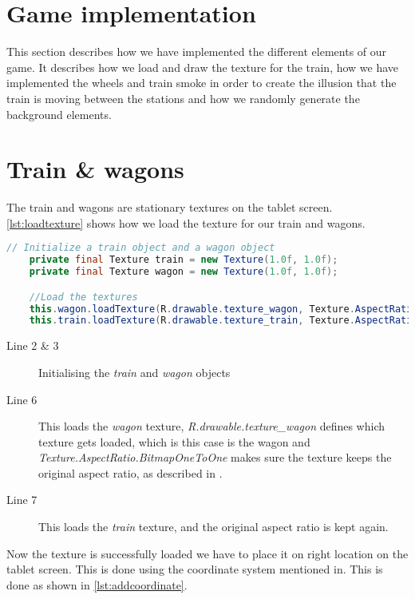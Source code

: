 \section{Game implementation}

This section describes how we have implemented the different elements of our game. It describes how we load and draw the texture for the train, how we have implemented the wheels and train smoke in order to create the illusion that the train is moving between the stations and how we randomly generate the background elements.



\section{Train \& wagons}

The train and wagons are stationary textures on the tablet screen. \autoref{lst:loadtexture} shows how we load the texture for our train and wagons. 

\begin{lstlisting}[language=java,firstnumber=1,caption={Loading the texture for our train and wagons},label=lst:loadtexture] 
	// Initialize a train object and a wagon object
	private final Texture train = new Texture(1.0f, 1.0f);
	private final Texture wagon = new Texture(1.0f, 1.0f);

	//Load the textures
	this.wagon.loadTexture(R.drawable.texture_wagon, Texture.AspectRatio.BitmapOneToOne);
	this.train.loadTexture(R.drawable.texture_train, Texture.AspectRatio.BitmapOneToOne); 
\end{lstlisting}

\begin{description}
\item[Line 2 \& 3] Initialising the \textit{train} and \textit{wagon} objects 
\item[Line 6] This loads the \textit{wagon} texture, \textit{R.drawable.texture\_wagon} defines which texture gets loaded, which is this case is the wagon and \textit{Texture.AspectRatio.BitmapOneToOne} makes sure the texture keeps the original aspect ratio, as described in .
\item[Line 7] This loads the \textit{train} texture, and the original aspect ratio is kept again. 
\end{description}

Now the texture is successfully loaded we have to place it on right location on the tablet screen. This is done using the coordinate system mentioned in. This is done as shown in \autoref{lst:addcoordinate}.

